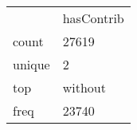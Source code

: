 \begin{tabular}{ll}
 & hasContrib \\
count & 27619 \\
unique & 2 \\
top & without \\
freq & 23740 \\
\end{tabular}
